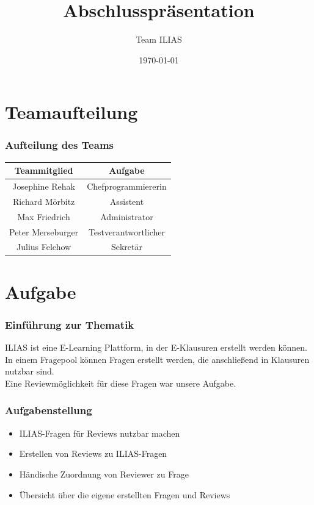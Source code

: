 \documentclass{beamer}
\title{Abschlusspräsentation}
\author{Team ILIAS}
\date{\today}
\begin{document}
	\maketitle
	\frame{\tableofcontents[]}

	\section{Teamaufteilung}
	\begin{frame}
		\frametitle{Aufteilung des Teams}
		\begin{tabular}{|c|c|}\hline
			Teammitglied & Aufgabe \\\hline
			Josephine Rehak & Chefprogrammiererin\\\hline
			Richard Mörbitz & Assistent\\\hline
			Max Friedrich & Administrator\\\hline
			Peter Merseburger & Testverantwortlicher\\\hline
			Julius Felchow & Sekretär\\\hline
		\end{tabular}
	\end{frame} 
 
	\section{Aufgabe}
		\begin{frame}
			\frametitle{Einführung zur Thematik}
  			ILIAS ist eine E-Learning Plattform, in der E-Klausuren erstellt werden können. In einem Fragepool 				können Fragen erstellt werden, die anschließend in Klausuren 					nutzbar sind.\\
  			\pause
    		Eine Reviewmöglichkeit für diese Fragen war unsere 				Aufgabe.
		\end{frame}
		\begin{frame}
			\frametitle{Aufgabenstellung}
			\begin{itemize}
				\item ILIAS-Fragen für Reviews nutzbar machen
				\item Erstellen von Reviews zu ILIAS-Fragen
				\item Händische Zuordnung von Reviewer zu Frage
				\item Übersicht über die eigene erstellten Fragen und Reviews
				
			\end{itemize}
		\end{frame}
\end{document}
